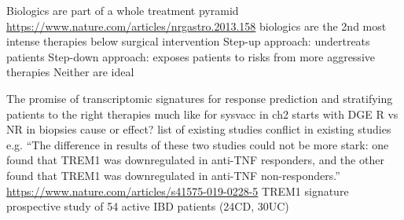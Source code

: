 \begin{outline}
\1 Biologics are part of a whole treatment pyramid \url{https://www.nature.com/articles/nrgastro.2013.158}
    \2 biologics are the 2nd most intense therapies below surgical intervention
    \2 Step-up approach: undertreats patients
    \2 Step-down approach: exposes patients to risks from more aggressive therapies
    \2 Neither are ideal

\1 The promise of transcriptomic signatures for response prediction and stratifying patients to the right therapies
    \2 much like for sysvacc in ch2
    \2 starts with DGE R vs NR in biopsies
    \2 cause or effect?
    \2 list of existing studies
    \2 conflict in existing studies e.g. \enquote{The difference in results of these two studies could not be more stark: one found that TREM1 was downregulated in anti-TNF responders, and the other found that TREM1 was downregulated in anti-TNF non-responders.} \url{https://www.nature.com/articles/s41575-019-0228-5}
    \2 TREM1 signature \autocite{verstockt2019LowTREM1Expression}
        \2 prospective study of 54 active IBD patients (24CD, 30UC)


\end{outline}
